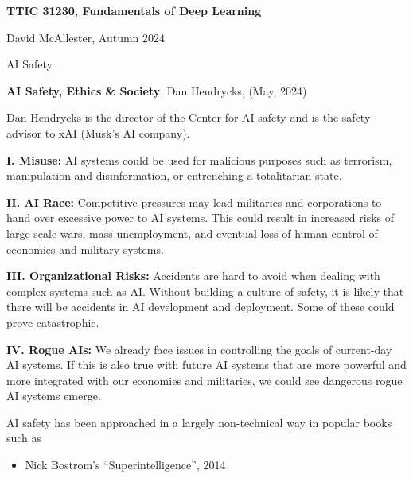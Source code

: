 




{\Huge

\centerline{\bf TTIC 31230, Fundamentals of Deep Learning}

\bigskip
\centerline{David McAllester, Autumn  2024}

\vfill
\centerline{AI Safety}

\vfill\vfill


{\bf AI Safety, Ethics \& Society}, Dan Hendrycks, (May, 2024)

\vfill
Dan Hendrycks is the director of the Center for AI safety and is the safety advisor to xAI (Musk's AI company).

\vfill


{\bf I. Misuse:} AI systems could be used for malicious purposes such as terrorism, manipulation and disinformation, or entrenching a totalitarian state.

\vfill
{\bf II. AI Race:} Competitive pressures may lead militaries and corporations to hand over excessive power to AI systems. This could result in increased risks of large-scale wars, mass unemployment, and eventual loss of human control of economies and military systems.


{\bf III. Organizational Risks:} Accidents are hard to avoid when dealing with complex systems such as AI. Without building a culture of safety, it is likely that there will be accidents in AI development and deployment. Some of these could prove catastrophic.

\vfill
{\bf IV. Rogue AIs:} We already face issues in controlling the goals of current-day AI systems. If this is also true with future AI systems that are more powerful and more integrated with our economies and militaries, we could see dangerous rogue AI systems emerge.


AI safety has been approached in a largely non-technical way in popular books such as

\vfill
\begin{itemize}
\item Nick Bostrom's ``Superintelligence'', 2014


\end{itemize}}
